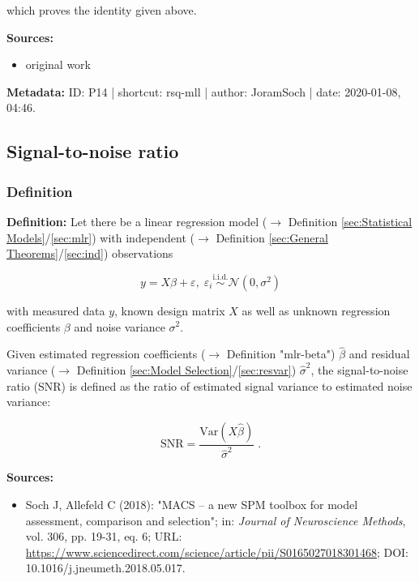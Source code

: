 \documentclass[a4paper,12pt,twoside]{book}
\begin{document}
which proves the identity given above.


\vspace{1em}
\textbf{Sources:}
\begin{itemize}
\item original work\end{itemize}


\vspace{1em}
\textbf{Metadata:} ID: P14 | shortcut: rsq-mll | author: JoramSoch | date: 2020-01-08, 04:46.
\vspace{1em}



\subsection{Signal-to-noise ratio}

\subsubsection[\textit{Definition}]{Definition} \label{sec:snr}
\setcounter{equation}{0}

\textbf{Definition:} Let there be a linear regression model ($\rightarrow$ Definition \ref{sec:Statistical Models}/\ref{sec:mlr}) with independent ($\rightarrow$ Definition \ref{sec:General Theorems}/\ref{sec:ind}) observations

\begin{equation} \label{eq:snr-mlr}
y = X\beta + \varepsilon, \; \varepsilon_i \overset{\mathrm{i.i.d.}}{\sim} \mathcal{N}(0, \sigma^2)
\end{equation}

with measured data $y$, known design matrix $X$ as well as unknown regression coefficients $\beta$ and noise variance $\sigma^2$.

Given estimated regression coefficients ($\rightarrow$ Definition "mlr-beta") $\hat{\beta}$ and residual variance ($\rightarrow$ Definition \ref{sec:Model Selection}/\ref{sec:resvar}) $\hat{\sigma}^2$, the signal-to-noise ratio (SNR) is defined as the ratio of estimated signal variance to estimated noise variance:

\begin{equation} \label{eq:snr-SNR}
\mathrm{SNR} = \frac{\mathrm{Var}(X\hat{\beta})}{\hat{\sigma}^2} \; .
\end{equation}


\vspace{1em}
\textbf{Sources:}
\begin{itemize}
\item Soch J, Allefeld C (2018): "MACS – a new SPM toolbox for model assessment, comparison and selection"; in: \textit{Journal of Neuroscience Methods}, vol. 306, pp. 19-31, eq. 6; URL: \url{https://www.sciencedirect.com/science/article/pii/S0165027018301468}; DOI: 10.1016/j.jneumeth.2018.05.017.
\end{itemize}
\end{document}
